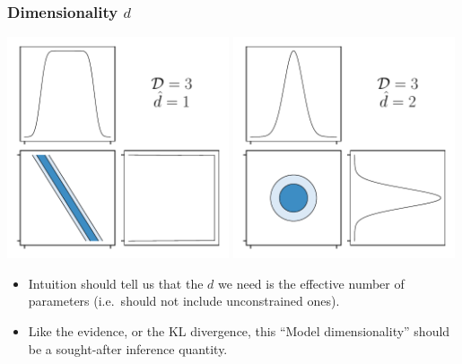 \documentclass[%
]{beamer}
\begin{document}
\begin{frame}
    \frametitle{Dimensionality $d$}
    \centerline{%
    \includegraphics[width=0.49\textwidth]{./figures/dimensions_1.pdf}
    \includegraphics[width=0.49\textwidth]{./figures/dimensions_2.pdf}
    }
    \begin{itemize}
        \item Intuition should tell us that the $d$ we need is the effective number of parameters (i.e.\ should not include unconstrained ones).
        \item Like the evidence, or the KL divergence, this ``Model dimensionality'' should be a sought-after inference quantity.
    \end{itemize}

\end{frame}
\end{document}
